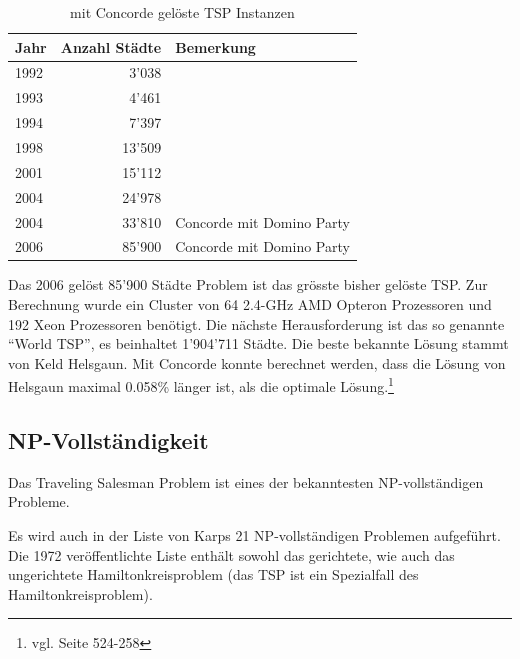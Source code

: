 \documentclass[11pt,a4paper]{article}
\begin{document}
        \begin{table}[H]
                \centering
                \begin{tabular}{| l | r | l |}
                    \hline
                        Jahr    & Anzahl Städte & Bemerkung                 \\ \hline
                        1992    & 3'038         &                           \\ \hline
                        1993    & 4'461         &                           \\ \hline
                        1994    & 7'397         &                           \\ \hline
                        1998    & 13'509        &                           \\ \hline
                        2001    & 15'112        &                           \\ \hline
                        2004    & 24'978        &                           \\ \hline
                        2004    & 33'810        & Concorde mit Domino Party \\ \hline
                        2006    & 85'900        & Concorde mit Domino Party \\ \hline
                \end{tabular}
                \caption{mit Concorde gelöste TSP Instanzen}
                \label{tab:concorde_history}
        \end{table}

Das 2006 gelöst 85'900 Städte Problem ist das grösste bisher gelöste TSP. Zur Berechnung wurde ein Cluster von 64 2.4-GHz AMD Opteron Prozessoren und 192 Xeon Prozessoren benötigt.
Die nächste Herausforderung ist das so genannte "`World TSP"', es beinhaltet 1'904'711 Städte. Die beste bekannte Lösung stammt von Keld Helsgaun. Mit Concorde konnte berechnet werden, dass die Lösung von Helsgaun maximal 0.058\% länger ist, als die optimale Lösung.\footnote{vgl. \cite{applegate06} Seite 524-258}

\newpage

\subsection{NP-Vollständigkeit}
Das Traveling Salesman Problem ist eines der bekanntesten NP-vollständigen Probleme. 

Es wird auch in der Liste von Karps 21 NP-vollständigen Problemen aufgeführt. Die 1972 veröffentlichte Liste\cite{karp72} enthält sowohl das gerichtete, wie auch das ungerichtete Hamiltonkreisproblem (das TSP ist ein Spezialfall des Hamiltonkreisproblem). 
\end{document}
